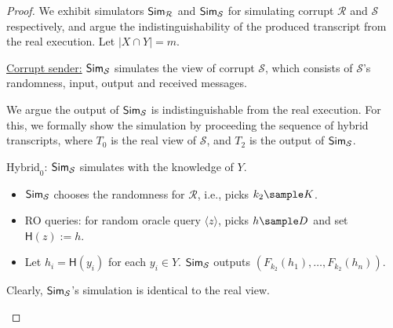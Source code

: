 \begin{proof}
We exhibit simulators $\mathsf{Sim}_\mathcal{R}$ and $\mathsf{Sim}_\mathcal{S}$ for simulating corrupt $\mathcal{R}$ and $\mathcal{S}$ respectively, 
and argue the indistinguishability of the produced transcript from the real execution. Let $|X \cap Y| = m$. 

\begin{trivlist}
\item \underline{Corrupt sender:} $\mathsf{Sim}_\mathcal{S}$ simulates the view of corrupt $\mathcal{S}$, 
    which consists of $\mathcal{S}$'s randomness, input, output and received messages.
 
    We argue the output of $\mathsf{Sim}_\mathcal{S}$ is indistinguishable from the real execution. 
    For this, we formally show the simulation by proceeding the sequence of hybrid transcripts, 
    where $T_0$ is the real view of $\mathcal{S}$, and $T_2$ is the output of $\mathsf{Sim}_\mathcal{S}$. 

\item $\text{Hybrid}_0$: $\mathsf{Sim}_\mathcal{S}$ simulates with the knowledge of $Y$. 
\begin{itemize}
    \item $\mathsf{Sim}_\mathcal{S}$ chooses the randomness for $\mathcal{R}$, i.e., picks $k_2 \sample K$.
    
    \item RO queries: for random oracle query $\langle z \rangle$, 
        picks $h \sample D$ and set $\mathsf{H}(z):=h$. 

    \item Let $h_i = \mathsf{H}(y_i)$ for each $y_i \in Y$. $\mathsf{Sim}_\mathcal{S}$ outputs $(F_{k_2}(h_1), \dots, F_{k_2}(h_n))$.     
\end{itemize}
Clearly, $\mathsf{Sim}_\mathcal{S}$'s simulation is identical to the real view. 

\begin{center}
\end{center}


\end{trivlist}
\end{proof}
